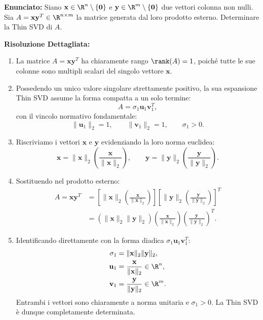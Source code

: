 \begin{example}[Thin SVD di una Matrice a Rango Unitario $A = \mathbf{x} \mathbf{y}^T$]
\textbf{Enunciato:} Siano $\mathbf{x} \in \R^n \setminus \{\mathbf{0}\}$ e $\mathbf{y} \in \R^m \setminus \{\mathbf{0}\}$ due vettori colonna non nulli. Sia $A = \mathbf{x} \mathbf{y}^T \in \R^{n \times m}$ la matrice generata dal loro prodotto esterno. Determinare la Thin SVD di $A$.

\medskip
\textbf{Risoluzione Dettagliata:}
\begin{enumerate}
    \item La matrice $A = \mathbf{x} \mathbf{y}^T$ ha chiaramente rango $\rank(A) = 1$, poich\'e tutte le sue colonne sono multipli scalari del singolo vettore $\mathbf{x}$.
    \item Possedendo un unico valore singolare strettamente positivo, la sua espansione Thin SVD assume la forma compatta a un solo termine:
    \begin{equation}
        A = \sigma_1 \mathbf{u}_1 \mathbf{v}_1^T,
    \end{equation}
    con il vincolo normativo fondamentale:
    \begin{equation}
        \|\mathbf{u}_1\|_2 = 1, \qquad \|\mathbf{v}_1\|_2 = 1, \qquad \sigma_1 > 0.
    \end{equation}
    \item Riscriviamo i vettori $\mathbf{x}$ e $\mathbf{y}$ evidenziando la loro norma euclidea:
    \begin{equation}
        \mathbf{x} = \|\mathbf{x}\|_2 \left( \frac{\mathbf{x}}{\|\mathbf{x}\|_2} \right), \qquad \mathbf{y} = \|\mathbf{y}\|_2 \left( \frac{\mathbf{y}}{\|\mathbf{y}\|_2} \right).
    \end{equation}
    \item Sostituendo nel prodotto esterno:
    \begin{align}
        A = \mathbf{x} \mathbf{y}^T &= \left[ \|\mathbf{x}\|_2 \left( \frac{\mathbf{x}}{\|\mathbf{x}\|_2} \right) \right] \left[ \|\mathbf{y}\|_2 \left( \frac{\mathbf{y}}{\|\mathbf{y}\|_2} \right) \right]^T \nonumber \\
        &= \left( \|\mathbf{x}\|_2 \|\mathbf{y}\|_2 \right) \left( \frac{\mathbf{x}}{\|\mathbf{x}\|_2} \right) \left( \frac{\mathbf{y}}{\|\mathbf{y}\|_2} \right)^T.
    \end{align}
    \item Identificando direttamente con la forma diadica $\sigma_1 \mathbf{u}_1 \mathbf{v}_1^T$:
    \begin{align}
        \sigma_1 &= \|\mathbf{x}\|_2 \|\mathbf{y}\|_2, \\
        \mathbf{u}_1 &= \frac{\mathbf{x}}{\|\mathbf{x}\|_2} \in \R^n, \\
        \mathbf{v}_1 &= \frac{\mathbf{y}}{\|\mathbf{y}\|_2} \in \R^m.
    \end{align}
    Entrambi i vettori sono chiaramente a norma unitaria e $\sigma_1 > 0$. La Thin SVD \`e dunque completamente determinata.
\end{enumerate}
\end{example}

